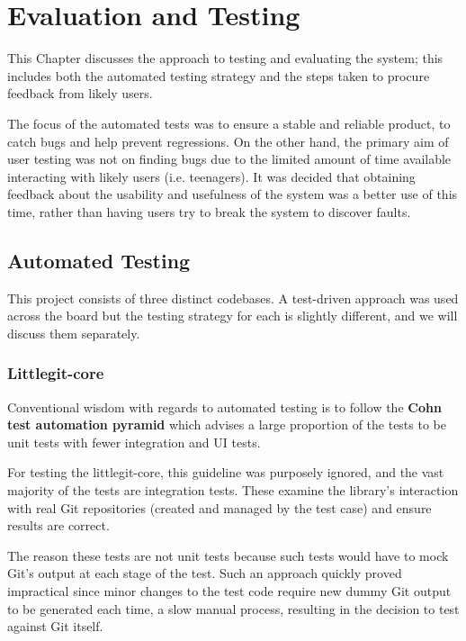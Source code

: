 \chapter{Evaluation and Testing}

This Chapter discusses the approach to testing and evaluating the system; this includes both the automated testing strategy and the steps taken to procure feedback from likely users. 

The focus of the automated tests was to ensure a stable and reliable product, to catch bugs and help prevent regressions. On the other hand, the primary aim of user testing was not on finding bugs due to the limited amount of time available interacting with likely users (i.e. teenagers). It was decided that obtaining feedback about the usability and usefulness of the system was a better use of this time, rather than having users try to break the system to discover faults.

\section{Automated Testing}

This project consists of three distinct codebases. A test-driven approach was used across the board but the testing strategy for each is slightly different, and we will discuss them separately. 

\subsection{Littlegit-core}

Conventional wisdom with regards to automated testing is to follow the \textbf{Cohn test automation pyramid} \cite{testpyramid} which advises a large proportion of the tests to be unit tests with fewer integration and UI tests.

For testing the littlegit-core, this guideline was purposely ignored, and the vast majority of the tests are integration tests. These examine the library's interaction with real Git repositories (created and managed by the test case) and ensure results are correct. 

The reason these tests are not unit tests because such tests would have to mock Git's output at each stage of the test. Such an approach quickly proved impractical since minor changes to the test code require new dummy Git output to be generated each time, a slow manual process, resulting in the decision to test against Git itself.

